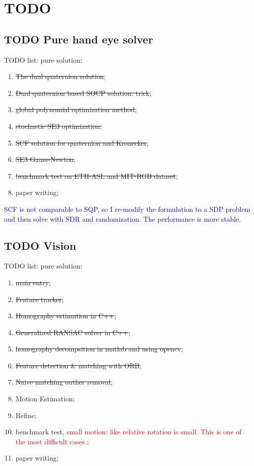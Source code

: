 \documentclass[a4paper]{report}
\begin{document}
\chapter{TODO}
\section{TODO Pure hand eye solver}
TODO list:
pure solution:
\begin{enumerate}
	\item \sout{The dual quaternion solution};
	\item \sout{Dual quaternion based SOCP solution: trick};
	\item \sout{global polynomial optimization method};
	\item \sout{stochastic SE3 optimization;}
	\item \sout{SCF solution for quaternion and Kronecker};
	\item \sout{SE3 Gauss-Newton};
	\item \sout{benchmark test on ETH-ASL and MIT-RGB dataset};
	\item paper writing;
\end{enumerate}
\textcolor{blue}{SCF is not comparable to SQP, so I re-modify the formulation to a SDP problem and then solve with SDR and randomization. The performance is more stable.}


\section{TODO Vision}
TODO list:
pure solution:
\begin{enumerate}
	\item \sout{main entry};
	\item \sout{Feature tracker};
	\item \sout{Homography estimation in C++};
	\item \sout{Generalized RANSAC solver in C++};
	\item \sout{homography decompsition in matlab and using opencv};
	\item \sout{Feature detection \& matching with ORB};
	\item \sout{Naive matching outlier removal};
	\item Motion Estimation;
	\item Refine;
	\item benchmark test, \textcolor{red}{small motion: like relative rotation is small. This is one of the most difficult cases.};
	\item paper writing;
\end{enumerate}
\end{document}
